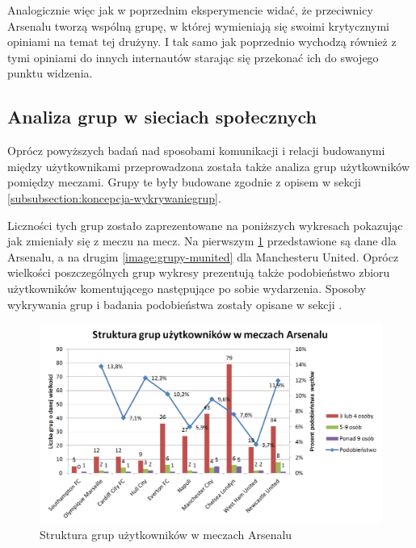 Analogicznie więc jak w poprzednim eksperymencie widać, że przeciwnicy
Arsenalu tworzą wspólną grupę, w której wymieniają się swoimi
krytycznymi opiniami na temat tej drużyny. I tak samo jak poprzednio
wychodzą również z tymi opiniami do innych internautów starając się
przekonać ich do swojego punktu widzenia.
















\subsection{Analiza grup w sieciach społecznych}
\label{subsection:strukturagrup}
Oprócz powyższych badań nad sposobami komunikacji i relacji budowanymi między
użytkownikami przeprowadzona została także analiza grup użytkowników 
pomiędzy meczami. Grupy te były budowane zgodnie z
opisem w sekcji \ref{subsubsection:koncepcja-wykrywaniegrup}.

Liczności tych grup zostało zaprezentowane na poniższych
wykresach pokazując jak zmieniały się z meczu na mecz.
Na pierwszym \ref{image:grupy-arsenal} przedstawione są dane
dla Arsenalu, a na drugim \ref{image:grupy-munited} dla Manchesteru United.
Oprócz wielkości poszczególnych grup wykresy prezentują także podobieństwo
zbioru użytkowników komentującego następujące po sobie wydarzenia.
Sposoby wykrywania grup i badania podobieństwa zostały opisane w sekcji
\label{subsection:miary-relacje}.
 
\begin{figure}[ht!]
\centering
\includegraphics[width=160mm]{img/grupy-arsenal-nums.png}
\caption{Struktura grup użytkowników w meczach Arsenalu}
\label{image:grupy-arsenal}
\end{figure}

